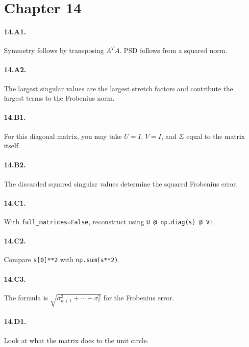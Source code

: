 \section*{Chapter 14}
\paragraph{14.A1.} Symmetry follows by transposing $A^TA$. PSD follows from a
squared norm.
\paragraph{14.A2.} The largest singular values are the largest stretch factors
and contribute the largest terms to the Frobenius norm.
\paragraph{14.B1.} For this diagonal matrix, you may take $U=I$, $V=I$, and
$\Sigma$ equal to the matrix itself.
\paragraph{14.B2.} The discarded squared singular values determine the squared
Frobenius error.
\paragraph{14.C1.} With \texttt{full\_matrices=False}, reconstruct using
\texttt{U @ np.diag(s) @ Vt}.
\paragraph{14.C2.} Compare \texttt{s[0]**2} with \texttt{np.sum(s**2)}.
\paragraph{14.C3.} The formula is
$\sqrt{\sigma_{k+1}^2+\cdots+\sigma_r^2}$ for the Frobenius error.
\paragraph{14.D1.} Look at what the matrix does to the unit circle.
